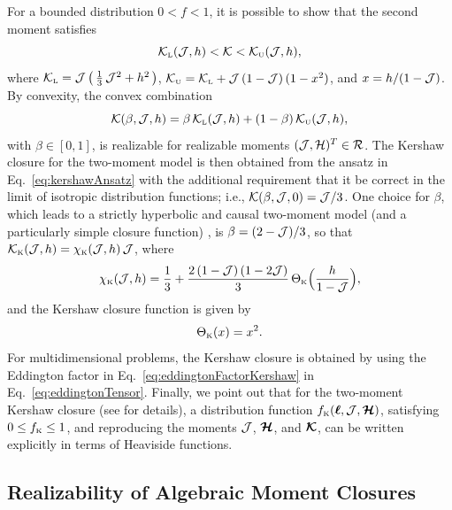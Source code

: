 For a bounded distribution $0<f<1$, it is possible to show that the second moment satisfies
\begin{equation}
  \mathcal{K}_{\mbox{\tiny L}}(\mathcal{J},h) < \mathcal{K} < \mathcal{K}_{\mbox{\tiny U}}(\mathcal{J},h),
\end{equation}
where $\mathcal{K}_{\mbox{\tiny L}}=\mathcal{J}\,\big(\,\frac{1}{3}\,\mathcal{J}^{2}+h^{2}\,\big)$, $\mathcal{K}_{\mbox{\tiny U}}=\mathcal{K}_{\mbox{\tiny L}} + \mathcal{J}\,(1-\mathcal{J})\,(1-x^{2})$, and $x=h/(1-\mathcal{J})$.  
By convexity, the convex combination
\begin{equation}
  \mathcal{K}(\beta,\mathcal{J},h)=\beta\,\mathcal{K}_{\mbox{\tiny L}}(\mathcal{J},h)+(1-\beta)\,\mathcal{K}_{\mbox{\tiny U}}(\mathcal{J},h),
  \label{eq:kershawAnsatz}
\end{equation}
with $\beta\in[0,1]$, is realizable for realizable moments $(\mathcal{J},\mathcal{H})^{T}\in\mathcal{R}$.  
The Kershaw closure for the two-moment model is then obtained from the ansatz in Eq.~\eqref{eq:kershawAnsatz} with the additional requirement that it be correct in the limit of isotropic distribution functions; i.e., $\mathcal{K}(\beta,\mathcal{J},0)=\mathcal{J}/3$.  
One choice for $\beta$, which leads to a strictly hyperbolic and causal two-moment model (and a particularly simple closure function) \cite{banachLarecki_2017a}, is $\beta=(2-\mathcal{J})/3$, so that $\mathcal{K}_{\mbox{\tiny K}}(\mathcal{J},h)=\chi_{\mbox{\tiny K}}(\mathcal{J},h)\,\mathcal{J}$, where
\begin{equation}
  \chi_{\mbox{\tiny K}}(\mathcal{J},h)=\frac{1}{3}+\frac{2\,(1-\mathcal{J})\,(1-2\mathcal{J})}{3}\,\Theta_{\mbox{\tiny K}}\Big(\frac{h}{1-\mathcal{J}}\Big),
  \label{eq:eddingtonFactorKershaw}
\end{equation}
and the Kershaw closure function is given by
\begin{equation}
  \Theta_{\mbox{\tiny K}}(x)=x^{2}.  
\end{equation}
For multidimensional problems, the Kershaw closure is obtained by using the Eddington factor in Eq.~\eqref{eq:eddingtonFactorKershaw} in Eq.~\eqref{eq:eddingtonTensor}.  
Finally, we point out that for the two-moment Kershaw closure (see \cite{banachLarecki_2017a} for details), a distribution function $f_{\mbox{\tiny K}}(\boldsymbol{\ell},\mathcal{J},\boldsymbol{\mathcal{H}})$, satisfying $0\le f_{\mbox{\tiny K}}\le1$, and reproducing the moments $\mathcal{J}$, $\boldsymbol{\mathcal{H}}$, and $\boldsymbol{\mathcal{K}}$, can be written explicitly in terms of Heaviside functions.  

\subsection{Realizability of Algebraic Moment Closures}

